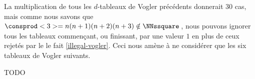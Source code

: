 \begin{center}
\end{center}


La multiplication de tous les $d$-tableaux de Vogler précédents donnerait $30$ cas, mais comme nous savons que $\consprod<3> = n(n+1)(n+2)(n+3) \notin \NNssquare$\,, nous pouvons ignorer tous les tableaux commençant, ou finissant, par une valeur $1$ en plus de ceux rejetés par le le fait \ref{illegal-vogler}.
Ceci nous amène à ne considérer que les six tableaux de Vogler suivants.

\begin{center}
\end{center}


TODO